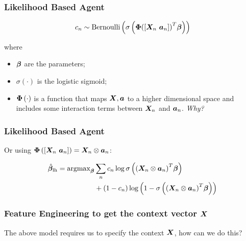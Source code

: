 
\begin{frame}
  \frametitle{Likelihood Based Agent}

  \[
    c_n \sim {\rm Bernoulli}
      \left(
        \sigma
          \left(
      \bm{\Phi} {\left( [\bm{X}_n ~ \bm{a}_n] \right)}^T \bm{\beta}
          \right)
      \right)
    \]

    where
    \begin{itemize}
      \item $\bm{\beta}$ are the parameters;
      \item $\sigma \left( \cdot \right)$ is the logistic sigmoid;
      \item $\bm{\Phi} \left( \cdot \right)$ is a function that maps $\bm{X},\bm{a}$ to a higher dimensional space and includes some interaction terms between ${\bm{X}}_n$ and ${\bm{a}}_n$. \pause \emph{Why?}
    \end{itemize}
    


\end{frame}

\begin{frame}
  \frametitle{Likelihood Based Agent}

Or using $\bm{\Phi} \left( \left[ {\bm{X}}_n ~ {\bm{a}}_n \right] \right) = {\bm{X}}_n \otimes {\bm{a}}_n$:

\begin{align*}
	\hat{\bm{\beta}}_{\rm lh} = {\rm argmax}_{\bm{\beta}}
	& \sum_n c_n \log \sigma
				\left(
					{
						\left(
							{\bm{X}}_n \otimes {\bm{a}}_n
						\right)
					}^T \bm{\beta}
				\right) \\
	& + \left(
		1-c_n
	  \right)
	  \log
	  \left(
	  	1 - \sigma
			\left(
				{
					\left(
						{\bm{X}}_n \otimes {\bm{a}}_n
					\right)
				}^T \bm{\beta}
			\right)
	\right)
  \end{align*}
\end{frame}


\begin{frame}
  \frametitle{Feature Engineering to get the context vector $\bm{X}$}

  The above model requires us to specify the context $\bm{X}$, how can we do this?
\end{frame}



